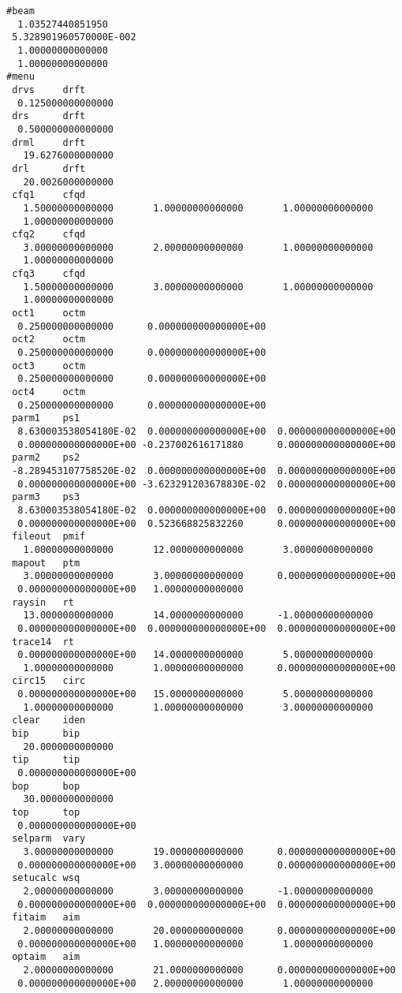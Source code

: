\begin{footnotesize}
\begin{verbatim}
#beam
  1.03527440851950
 5.328901960570000E-002
  1.00000000000000
  1.00000000000000
#menu
 drvs     drft
  0.125000000000000
 drs      drft
  0.500000000000000
 drml     drft
   19.6276000000000
 drl      drft
   20.0026000000000
 cfq1     cfqd
   1.50000000000000       1.00000000000000       1.00000000000000
   1.00000000000000
 cfq2     cfqd
   3.00000000000000       2.00000000000000       1.00000000000000
   1.00000000000000
 cfq3     cfqd
   1.50000000000000       3.00000000000000       1.00000000000000
   1.00000000000000
 oct1     octm
  0.250000000000000      0.000000000000000E+00
 oct2     octm
  0.250000000000000      0.000000000000000E+00
 oct3     octm
  0.250000000000000      0.000000000000000E+00
 oct4     octm
  0.250000000000000      0.000000000000000E+00
 parm1    ps1
  8.630003538054180E-02  0.000000000000000E+00  0.000000000000000E+00
  0.000000000000000E+00 -0.237002616171880      0.000000000000000E+00
 parm2    ps2
 -8.289453107758520E-02  0.000000000000000E+00  0.000000000000000E+00
  0.000000000000000E+00 -3.623291203678830E-02  0.000000000000000E+00
 parm3    ps3
  8.630003538054180E-02  0.000000000000000E+00  0.000000000000000E+00
  0.000000000000000E+00  0.523668825832260      0.000000000000000E+00
 fileout  pmif
   1.00000000000000       12.0000000000000       3.00000000000000
 mapout   ptm
   3.00000000000000       3.00000000000000      0.000000000000000E+00
  0.000000000000000E+00   1.00000000000000
 raysin   rt
   13.0000000000000       14.0000000000000      -1.00000000000000
  0.000000000000000E+00  0.000000000000000E+00  0.000000000000000E+00
 trace14  rt
  0.000000000000000E+00   14.0000000000000       5.00000000000000
   1.00000000000000       1.00000000000000      0.000000000000000E+00
 circ15   circ
  0.000000000000000E+00   15.0000000000000       5.00000000000000
   1.00000000000000       1.00000000000000       3.00000000000000
 clear    iden
 bip      bip
   20.0000000000000
 tip      tip
  0.000000000000000E+00
 bop      bop
   30.0000000000000
 top      top
  0.000000000000000E+00
 selparm  vary
   3.00000000000000       19.0000000000000      0.000000000000000E+00
  0.000000000000000E+00   3.00000000000000      0.000000000000000E+00
 setucalc wsq
   2.00000000000000       3.00000000000000      -1.00000000000000
  0.000000000000000E+00  0.000000000000000E+00  0.000000000000000E+00
 fitaim   aim
   2.00000000000000       20.0000000000000      0.000000000000000E+00
  0.000000000000000E+00   1.00000000000000       1.00000000000000
 optaim   aim
   2.00000000000000       21.0000000000000      0.000000000000000E+00
  0.000000000000000E+00   2.00000000000000       1.00000000000000

\end{verbatim}
\end{footnotesize}
